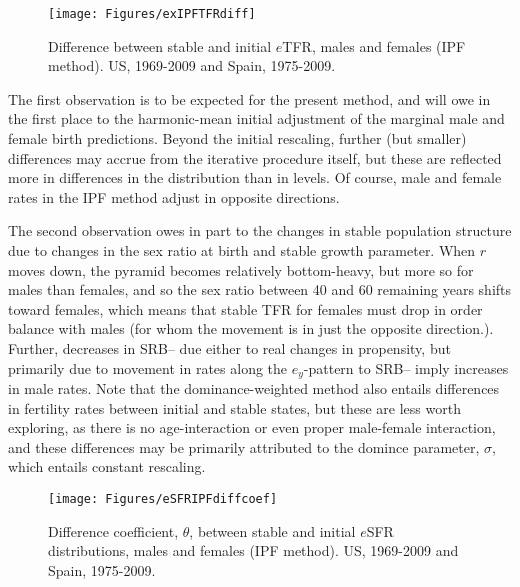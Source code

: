 \begin{figure}[ht!]
        \centering  
          \caption{Difference between stable and initial $e$TFR, males and
          females (IPF method). US, 1969-2009 and Spain,
          1975-2009.}
           \texttt{[image: Figures/exIPFTFRdiff]}
          \label{fig:exIPFTFRdiff}
\end{figure}

The first observation
is to be expected for the present method, and will owe in the first place to the
harmonic-mean initial adjustment of the marginal male and female birth
predictions. Beyond the initial rescaling, further (but smaller) differences may
accrue from the iterative procedure itself, but these are reflected more in
differences in the distribution than in levels. Of course, male and female rates
in the IPF method adjust in opposite directions. 

The second observation owes
in part to the changes in stable population structure due to changes in the sex
ratio at birth and stable growth parameter. When $r$ moves down, the pyramid
becomes relatively bottom-heavy, but more so for males than females, and so the
sex ratio between 40 and 60 remaining years shifts toward females, which means
that stable TFR for females must drop in order balance with males (for whom the
movement is in just the opposite direction.). Further, decreases in SRB-- due
either to real changes in propensity, but primarily due to movement in rates
along the $e_y$-pattern to SRB-- imply increases in male rates. Note that the
dominance-weighted method also entails differences in fertility rates
between initial and stable states, but these are less worth exploring, as there
is no age-interaction or even proper male-female interaction, and these
differences may be primarily attributed to the domince parameter, $\sigma$,
which entails constant rescaling.

\begin{figure}[ht!]
        \centering  
          \caption{Difference coefficient, $\theta$, between stable and initial
          $e$SFR distributions, males and females (IPF method). US, 1969-2009
          and Spain, 1975-2009.}
           \texttt{[image: Figures/eSFRIPFdiffcoef]}
          \label{fig:exIPFdiffcoef}
\end{figure}

